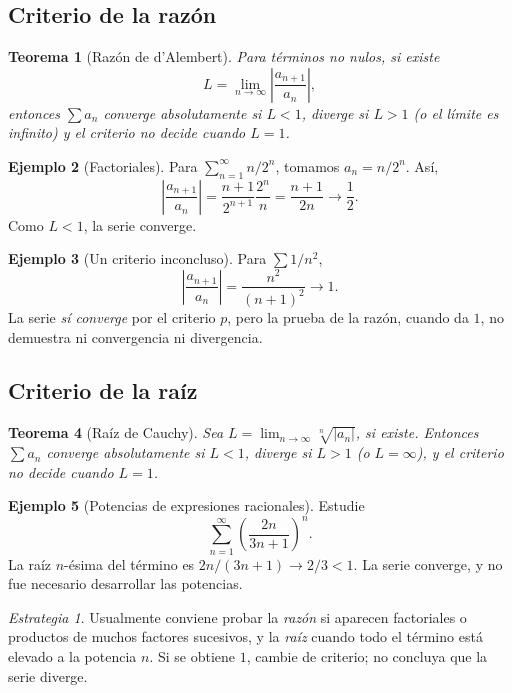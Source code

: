 \documentclass[12pt]{article}
\newtheorem{teorema}{Teorema}[section]
\theoremstyle{definition}
\newtheorem{ejemplo}[teorema]{Ejemplo}
\theoremstyle{remark}
\newtheorem*{estrategia}{Estrategia}
\begin{document}
\subsection*{Criterio de la razón}
\begin{teorema}[Razón de d'Alembert]
Para términos no nulos, si existe
\[L=\lim_{n\to\infty}\left|\frac{a_{n+1}}{a_n}\right|,\]
entonces $\sum a_n$ converge absolutamente si $L<1$, diverge si $L>1$ (o el límite es infinito) y el criterio \emph{no decide} cuando $L=1$.
\end{teorema}
\begin{ejemplo}[Factoriales]
Para $\sum_{n=1}^{\infty}n/2^n$, tomamos $a_n=n/2^n$. Así,
\[\left|\frac{a_{n+1}}{a_n}\right|
=\frac{n+1}{2^{n+1}}\frac{2^n}{n}
=\frac{n+1}{2n}\longrightarrow\boxed{\frac12}.\]
Como $L<1$, la serie converge.
\end{ejemplo}
\begin{ejemplo}[Un criterio inconcluso]
Para $\sum1/n^2$,
\[\left|\frac{a_{n+1}}{a_n}\right|=\frac{n^2}{(n+1)^2}\longrightarrow1.\]
La serie \emph{sí converge} por el criterio $p$, pero la prueba de la razón, cuando da $1$, no demuestra ni convergencia ni divergencia.
\end{ejemplo}

\subsection*{Criterio de la raíz}
\begin{teorema}[Raíz de Cauchy]
Sea $L=\lim_{n\to\infty}\sqrt[n]{|a_n|}$, si existe. Entonces $\sum a_n$ converge absolutamente si $L<1$, diverge si $L>1$ (o $L=\infty$), y el criterio no decide cuando $L=1$.
\end{teorema}
\begin{ejemplo}[Potencias de expresiones racionales]
Estudie
\[\sum_{n=1}^\infty\left(\frac{2n}{3n+1}\right)^n.\]
La raíz $n$-ésima del término es $2n/(3n+1)\to2/3<1$. La serie converge, y no fue necesario desarrollar las potencias.
\end{ejemplo}
\begin{estrategia}
Usualmente conviene probar la \emph{razón} si aparecen factoriales o productos de muchos factores sucesivos, y la \emph{raíz} cuando todo el término está elevado a la potencia $n$. Si se obtiene $1$, cambie de criterio; no concluya que la serie diverge.
\end{estrategia}

\end{document}
